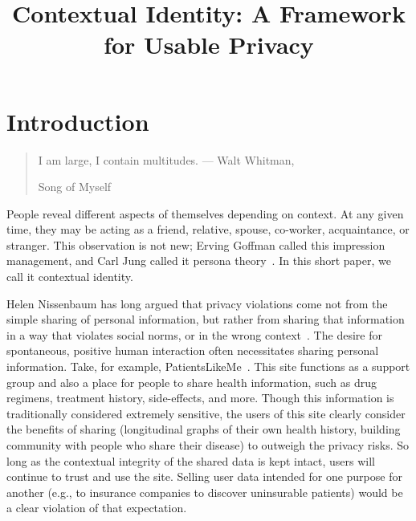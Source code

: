 \documentclass{llncs}
\begin{document}
\title{Contextual Identity: A Framework for Usable Privacy}

\maketitle
\section{Introduction}
\begin{quote}I am large, I contain multitudes. --- Walt Whitman,
\begin{em}Song of Myself\end{em} \end{quote}

People reveal different aspects of themselves depending on context. At any
given time, they may be acting as a friend, relative, spouse, co-worker,
acquaintance, or stranger. This observation is not new; Erving Goffman called
this impression management, and Carl Jung called it persona
theory~\cite{goffman,jung}. In this short paper, we call it contextual identity.

Helen Nissenbaum has long argued that privacy violations come not from the
simple sharing of personal information, but rather from sharing that
information in a way that violates social norms, or in the wrong
context~\cite{nissenbaum}. The desire for spontaneous, positive human
interaction often necessitates sharing personal information. Take, for example,
PatientsLikeMe~\cite{patientslikeme}. This site functions as a support group
and also a place for people to share health information, such as drug regimens,
treatment history, side-effects, and more. Though this information is
traditionally considered extremely sensitive, the users of this site clearly
consider the benefits of sharing (longitudinal graphs of their own health
history, building community with people who share their disease) to outweigh
the privacy risks. So long as the contextual integrity of the shared data is
kept intact, users will continue to trust and use the site. Selling user data
intended for one purpose for another (e.g., to insurance companies to discover
uninsurable patients) would be a clear violation of that expectation.
\end{document}

